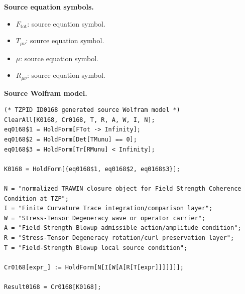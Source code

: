 \begin{minipage}[t]{0.49\linewidth}
\begingroup
\small
\raggedright
\textbf{Source equation symbols.}\par
\begin{itemize}[leftmargin=1.35em,itemsep=1pt,topsep=1pt,parsep=0pt]
    \item $F_{\mathrm{tot}}$: source equation symbol.
    \item $T_{\mu\nu}$: source equation symbol.
    \item $\mu$: source equation symbol.
    \item $R_{\mu\nu}$: source equation symbol.
\end{itemize}
\endgroup
\end{minipage}\hfill
\begin{minipage}[t]{0.47\linewidth}
\begingroup
\scriptsize
\raggedright
\textbf{Source Wolfram model.}\par
\begin{Verbatim}[fontsize=\tiny,breaklines=true,breakanywhere=true]
(* TZPID ID0168 generated source Wolfram model *)
ClearAll[K0168, Cr0168, T, R, A, W, I, N];
eq0168$1 = HoldForm[FTot -> Infinity];
eq0168$2 = HoldForm[Det[TMunu] == 0];
eq0168$3 = HoldForm[Tr[RMunu] < Infinity];

K0168 = HoldForm[{eq0168$1, eq0168$2, eq0168$3}];

N = "normalized TRAWIN closure object for Field Strength Coherence Condition at TZP";
I = "Finite Curvature Trace integration/comparison layer";
W = "Stress-Tensor Degeneracy wave or operator carrier";
A = "Field-Strength Blowup admissible action/amplitude condition";
R = "Stress-Tensor Degeneracy rotation/curl preservation layer";
T = "Field-Strength Blowup local source condition";

Cr0168[expr_] := HoldForm[N[I[W[A[R[T[expr]]]]]]];

Result0168 = Cr0168[K0168];
\end{Verbatim}
\endgroup
\end{minipage}

